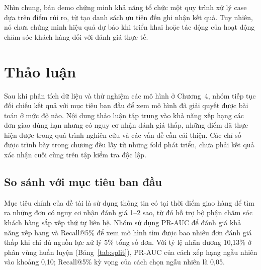 \documentclass[12pt,a4paper]{report}
\begin{document}
Nhìn chung, bản demo chứng minh khả năng tổ chức một quy trình xử lý case dựa trên điểm rủi ro, từ tạo danh sách ưu tiên đến ghi nhận kết quả. Tuy nhiên, nó chưa chứng minh hiệu quả dự báo khi triển khai hoặc tác động của hoạt động chăm sóc khách hàng đối với đánh giá thực tế.
 
\chapter{Thảo luận}\label{ch:discussion}

Sau khi phân tích dữ liệu và thử nghiệm các mô hình ở Chương~4, nhóm tiếp tục đối chiếu kết quả với mục tiêu ban đầu để xem mô hình đã giải quyết được bài toán ở mức độ nào. Nội dung thảo luận tập trung vào khả năng xếp hạng các đơn giao đúng hạn nhưng có nguy cơ nhận đánh giá thấp, những điểm đã thực hiện được trong quá trình nghiên cứu và các vấn đề cần cải thiện. Các chỉ số được trình bày trong chương đều lấy từ những fold phát triển, chưa phải kết quả xác nhận cuối cùng trên tập kiểm tra độc lập.

\section{So sánh với mục tiêu ban đầu}\label{sec:disc-goals}

Mục tiêu chính của đề tài là sử dụng thông tin có tại thời điểm giao hàng để tìm ra những đơn có nguy cơ nhận đánh giá 1--2 sao, từ đó hỗ trợ bộ phận chăm sóc khách hàng sắp xếp thứ tự liên hệ. Nhóm sử dụng PR-AUC để đánh giá khả năng xếp hạng và Recall@5\% để xem mô hình tìm được bao nhiêu đơn đánh giá thấp khi chỉ đủ nguồn lực xử lý 5\% tổng số đơn. Với tỷ lệ nhãn dương 10,13\% ở phân vùng huấn luyện (Bảng~\ref{tab:split}), PR-AUC của cách xếp hạng ngẫu nhiên vào khoảng 0,10; Recall@5\% kỳ vọng của cách chọn ngẫu nhiên là 0,05.
\end{document}
